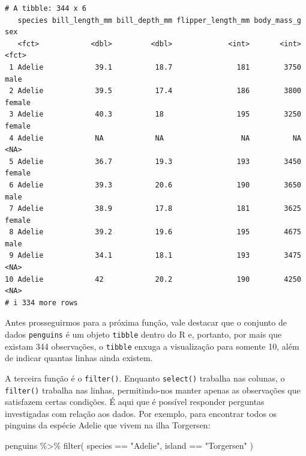 \documentclass[
  12pt,
  letterpaper,
  DIV=11,
  numbers=noendperiod]{scrreprt}
\newenvironment{Shaded}{\begin{snugshade}}{\end{snugshade}}
\newcommand{\FunctionTok}[1]{\textcolor[rgb]{0.28,0.35,0.67}{#1}}
\newcommand{\NormalTok}[1]{\textcolor[rgb]{0.00,0.23,0.31}{#1}}
\newcommand{\SpecialCharTok}[1]{\textcolor[rgb]{0.37,0.37,0.37}{#1}}
\newcommand{\StringTok}[1]{\textcolor[rgb]{0.13,0.47,0.30}{#1}}
\theoremstyle{definition}
\theoremstyle{exemplo}
\begin{document}
\begin{verbatim}
# A tibble: 344 x 6
   species bill_length_mm bill_depth_mm flipper_length_mm body_mass_g sex   
   <fct>            <dbl>         <dbl>             <int>       <int> <fct> 
 1 Adelie            39.1          18.7               181        3750 male  
 2 Adelie            39.5          17.4               186        3800 female
 3 Adelie            40.3          18                 195        3250 female
 4 Adelie            NA            NA                  NA          NA <NA>  
 5 Adelie            36.7          19.3               193        3450 female
 6 Adelie            39.3          20.6               190        3650 male  
 7 Adelie            38.9          17.8               181        3625 female
 8 Adelie            39.2          19.6               195        4675 male  
 9 Adelie            34.1          18.1               193        3475 <NA>  
10 Adelie            42            20.2               190        4250 <NA>  
# i 334 more rows
\end{verbatim}

Antes prosseguirmos para a próxima função, vale destacar que o conjunto
de dados \texttt{penguins} é um objeto \texttt{tibble} dentro do R e,
portanto, por mais que existam 344 observações, o \texttt{tibble} enxuga
a visualização para somente 10, além de indicar quantas linhas ainda
existem.

A terceira função é o \texttt{filter()}. Enquanto \texttt{select()}
trabalha nas colunas, o \texttt{filter()} trabalha nas linhas,
permitindo-nos manter apenas as observações que satisfazem certas
condições. É aqui que é possível responder perguntas investigadas com
relação aos dados. Por exemplo, para encontrar todos os pinguins da
espécie Adelie que vivem na ilha Torgersen:

\begin{Shaded}
\begin{Highlighting}[]
\NormalTok{penguins }\SpecialCharTok{\%\textgreater{}\%} 
  \FunctionTok{filter}\NormalTok{(}
\NormalTok{      species }\SpecialCharTok{==} \StringTok{"Adelie"}\NormalTok{, island }\SpecialCharTok{==} \StringTok{"Torgersen"}
\NormalTok{    )}
\end{Highlighting}
\end{Shaded}
\end{document}
